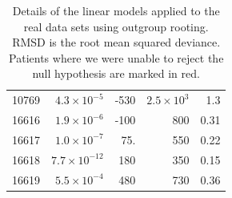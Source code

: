 \documentclass[12pt]{article}
\begin{document}
\begin{table}[!ht]
\begin{center}
\begin{tabular}{lrrrr}
10769 & $4.3 \times 10^{-5}$ & -530 & $2.5 \times 10^3$ & 1.3 \\
16616 & $1.9 \times 10^{-6}$ & -100 & 800 & 0.31 \\
16617 & $1.0 \times 10^{-7}$ & 75. & 550 & 0.22 \\
16618 & $7.7 \times 10^{-12}$ & 180 & 350 & 0.15 \\
16619 & $5.5 \times 10^{-4}$ & 480 & 730 & 0.36 \\
\hline
\end{tabular}
\end{center}
  \caption{Details of the linear models applied to the real data sets using outgroup rooting. RMSD is the root mean squared deviance. Patients where we were unable to reject the null hypothesis are marked in red.
   }\label{tab:patientserrorogr} 
\end{table}
\end{document}
